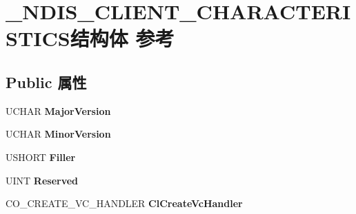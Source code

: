 \hypertarget{struct___n_d_i_s___c_l_i_e_n_t___c_h_a_r_a_c_t_e_r_i_s_t_i_c_s}{}\section{\+\_\+\+N\+D\+I\+S\+\_\+\+C\+L\+I\+E\+N\+T\+\_\+\+C\+H\+A\+R\+A\+C\+T\+E\+R\+I\+S\+T\+I\+C\+S结构体 参考}
\label{struct___n_d_i_s___c_l_i_e_n_t___c_h_a_r_a_c_t_e_r_i_s_t_i_c_s}
\subsection*{Public 属性}
\begin{DoxyCompactItemize}
\item 
\mbox{\label{struct___n_d_i_s___c_l_i_e_n_t___c_h_a_r_a_c_t_e_r_i_s_t_i_c_s_a1e0630f6d2526b4a8216898b3b6b90f7}} 
U\+C\+H\+AR {\bfseries Major\+Version}
\item 
\mbox{\label{struct___n_d_i_s___c_l_i_e_n_t___c_h_a_r_a_c_t_e_r_i_s_t_i_c_s_a8531f3fbe603a9168535fc22fd8fc491}} 
U\+C\+H\+AR {\bfseries Minor\+Version}
\item 
\mbox{\label{struct___n_d_i_s___c_l_i_e_n_t___c_h_a_r_a_c_t_e_r_i_s_t_i_c_s_aab82984304add721701317391562d534}} 
U\+S\+H\+O\+RT {\bfseries Filler}
\item 
\mbox{\label{struct___n_d_i_s___c_l_i_e_n_t___c_h_a_r_a_c_t_e_r_i_s_t_i_c_s_a97377c7d9b99fee572b51b33814c94d0}} 
U\+I\+NT {\bfseries Reserved}
\item 
\mbox{\label{struct___n_d_i_s___c_l_i_e_n_t___c_h_a_r_a_c_t_e_r_i_s_t_i_c_s_a421520949af6b6fa0e6f26e3ed3781a7}} 
C\+O\+\_\+\+C\+R\+E\+A\+T\+E\+\_\+\+V\+C\+\_\+\+H\+A\+N\+D\+L\+ER {\bfseries Cl\+Create\+Vc\+Handler}
\item 
\mbox{\label{struct___n_d_i_s___c_l_i_e_n_t___c_h_a_r_a_c_t_e_r_i_s_t_i_c_s_abf60f61f8d1e34978767f18a74ac0052}} 

\end{DoxyCompactItemize}
